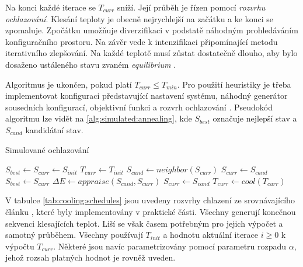 Na konci každé iterace se $T_{curr}$ sníží.
Její průběh je řízen pomocí \textit{rozvrhu ochlazování}.
Klesání teploty je obecně nejrychlejší na začátku a ke konci se zpomaluje.
Zpočátku umožňuje diverzifikaci v podstatě náhodným prohledáváním konfiguračního prostoru.
Na závěr vede k intenzifikaci připomínající metodu iterativního zlepšování.
Na každé teplotě musí zůstat dostatečně dlouho, aby bylo dosaženo ustáleného stavu zvaném \textit{equilibrium} \cite{rutenbar, kirkpatrik}.

Algoritmus je ukončen, pokud platí $T_{curr}\leq T_{min}$.
Pro použití heuristiky je třeba implementovat konfiguraci představující nastavení systému, náhodný generátor sousedních konfigurací, objektivní funkci a rozvrh ochlazování \cite{kirkpatrik}.
Pseudokód algoritmu lze vidět na \ref{alg:simulated:annealing}, kde $S_{best}$ označuje nejlepší stav a $S_{cand}$ kandidátní stav.

\begin{algorithm}
\caption{Simulované ochlazování}\label{alg:simulated:annealing}
\begin{algorithmic}
\State $S_{best} \gets S_{curr} \gets S_{init}$
\State $T_{curr} \gets T_{init}$
     
        \State $S_{cand} \gets neighbor(S_{curr})$
         
            \State $S_{curr} \gets S_{cand}$
                \State $S_{best} \gets S_{curr}$
            \EndIf
        \Else {}
            \State $\Delta E \gets appraise(S_{cand}, S_{curr})$
                \State $S_{curr} \gets S_{cand}$
            \EndIf
        \EndIf
        \State $T_{curr} \gets cool(T_{curr})$
    \EndFor
\EndWhile
\State {}
\end{algorithmic}
\end{algorithm}

V tabulce \ref{tab:cooling:schedules} jsou uvedeny rozvrhy chlazení ze srovnávajícího článku \cite{cooling-comparison}, které byly implementovány v praktické části.
Všechny generují konečnou sekvenci klesajících teplot.
Liší se však časem potřebným pro jejich výpočet a samotný průběhem.
Všechny používají $T_{init}$ a hodnotu aktuální iterace $i\geq 0$ k výpočtu $T_{curr}$.
Některé jsou navíc parametrizovány pomocí parametru rozpadu $\alpha$, jehož rozsah platných hodnot je rovněž uveden.

